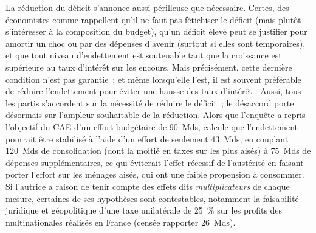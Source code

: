 \documentclass[12pt,french]{article}
\begin{document}
La réduction du déficit s'annonce aussi périlleuse que nécessaire. 
Certes, des économistes comme \cite{geerolf_dette_2021} rappellent qu'il ne faut pas fétichiser le déficit (mais plutôt s'intéresser à la composition du budget), qu'un déficit élevé peut se justifier pour amortir un choc %
ou par des dépenses d'avenir (surtout si elles sont temporaires), et que tout niveau d'endettement est soutenable tant que la croissance est supérieure au taux d'intérêt sur les encours. Mais précisément, cette dernière condition n'est pas garantie~; et même lorsqu'elle l'est, il est souvent préférable de réduire l'endettement pour éviter une hausse des taux d'intérêt \citep{mian_goldilocks_2025}. Aussi, tous les partis s'accordent sur la nécessité de réduire le déficit~; le désaccord porte désormais sur l'ampleur souhaitable de la réduction. Alors que l'enquête a repris l'objectif du CAE d'un effort budgétaire de 90~Mds, \cite{delatte_redresser_2025} calcule que l'endettement pourrait être stabilisé à l'aide d'un effort de seulement 43~Mds, %
en couplant 120~Mds de consolidation (dont la moitié en taxes sur les plus aisés) à 75~Mds de dépenses supplémentaires, ce qui éviterait l'effet récessif de l'austérité en faisant porter l'effort sur les ménages aisés, qui ont une faible propension à consommer. 
Si l'autrice a raison de tenir compte des effets dits \textit{multiplicateurs} de chaque mesure, certaines de ses hypothèses sont contestables, notamment %
la faisabilité juridique et géopolitique d'une taxe unilatérale de 25~\% sur les profits des multinationales réalisés en France (censée rapporter 26~Mds). 
\end{document}

